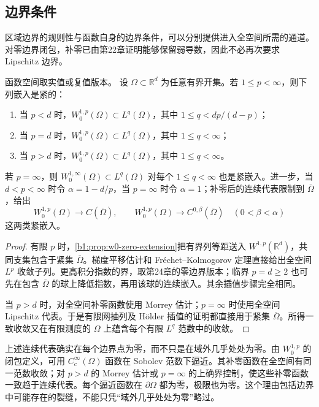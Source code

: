 \subsection{边界条件}
\label{b1:subsec:250203}

区域边界的规则性与函数自身的边界条件，可以分别提供进入全空间所需的通道。对零边界闭包，补零已由第22章证明能够保留弱导数，因此不必再次要求 Lipschitz 边界。

\begin{corollary}\label{b1:cor:rellich-zero-boundary}
函数空间取实值或复值版本。
设 \(\Omega\subset\mathbb R^d\) 为任意有界开集。若 \(1\le p<\infty\)，则下列嵌入是紧的：
\begin{enumerate}
\item 当 \(p<d\) 时，\(W_0^{1,p}(\Omega)\subset L^q(\Omega)\)，其中 \(1\le q<dp/(d-p)\)；
\item 当 \(p=d\) 时，\(W_0^{1,p}(\Omega)\subset L^q(\Omega)\)，其中 \(1\le q<\infty\)；
\item 当 \(p>d\) 时，\(W_0^{1,p}(\Omega)\subset L^q(\Omega)\)，其中 \(1\le q<\infty\)。
\end{enumerate}
若 \(p=\infty\)，则 \(W_0^{1,\infty}(\Omega)\subset L^q(\Omega)\) 对每个 \(1\le q<\infty\) 也是紧嵌入。进一步，当 \(d<p<\infty\) 时令 \(\alpha=1-d/p\)，当 \(p=\infty\) 时令 \(\alpha=1\)；补零后的连续代表限制到 \(\overline\Omega\)，给出
\[
 W_0^{1,p}(\Omega)\longrightarrow C(\overline\Omega),
 \qquad
 W_0^{1,p}(\Omega)\longrightarrow C^{0,\beta}(\overline\Omega)
 \quad(0<\beta<\alpha)
\]
这两类紧嵌入。
\end{corollary}
\begin{proof}
有限 \(p\) 时，\cref{b1:prop:w0-zero-extension}把有界列等距送入 \(W^{1,p}(\mathbb R^d)\)，共同支集包含于紧集 \(\overline\Omega\)。梯度平移估计和 Fréchet–Kolmogorov 定理直接给出全空间 \(L^p\) 收敛子列。更高积分指数的界，取第24章的零边界版本；临界 \(p=d\ge2\) 也可先在包含 \(\overline\Omega\) 的球上降低指数，再用该球的连续嵌入。其余插值步骤完全相同。

当 \(p>d\) 时，对全空间补零函数使用 Morrey 估计；\(p=\infty\) 时使用全空间 Lipschitz 代表。于是有限网抽列及 Hölder 插值的证明都直接用于紧集 \(\overline\Omega\)。所得一致收敛又在有限测度的 \(\Omega\) 上蕴含每个有限 \(L^q\) 范数中的收敛。
\end{proof}

上述连续代表确实在每个边界点为零，而不只是在域外几乎处处为零。由 \(W_0^{1,p}\) 的闭包定义，可用 \(C_c^\infty(\Omega)\) 函数在 Sobolev 范数下逼近。其补零函数在全空间有同一范数收敛；对 \(p>d\) 的 Morrey 估计或 \(p=\infty\) 的上确界控制，使这些补零函数一致趋于连续代表。每个逼近函数在 \(\partial\Omega\) 都为零，极限也为零。这个理由包括边界中可能存在的裂缝，不能只凭“域外几乎处处为零”略过。

